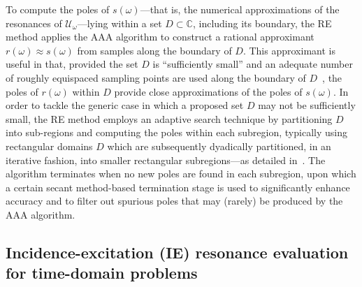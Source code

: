 \documentclass[11pt]{article}
\theoremstyle{plain}
\theoremstyle{remark}
\begin{document}
To compute the poles of $s(\omega)$---that is, the numerical
approximations of the resonances of $\mathcal{U}_\omega$---lying
within a set $D\subset \mathbb{C}$, including its boundary, the RE
method applies the AAA algorithm to construct a rational approximant
$r(\omega)\approx s(\omega)$ from samples along the boundary of
$D$. This approximant is useful in that, provided the set $D$ is
``sufficiently small'' and an adequate number of roughly equispaced
sampling points are used along the boundary of $D$~\cite[Rem. 4]{bst},
the poles of $r(\omega)$ within $D$ provide close approximations of
the poles of $s(\omega)$. In order to tackle the generic case in which
a proposed set $D$ may not be sufficiently small, the RE method
employs an adaptive search technique by partitioning $D$ into
sub-regions and computing the poles within each subregion, typically
using rectangular domains $D$ which are subsequently dyadically
partitioned, in an iterative fashion, into smaller rectangular
subregions---as detailed in~\cite{bst}. The algorithm terminates when
no new poles are found in each subregion, upon which a certain secant
method-based termination stage is used to significantly enhance
accuracy and to filter out spurious poles that may (rarely) be
produced by the AAA algorithm.

\subsection{Incidence-excitation  (IE) resonance evaluation for time-domain problems}\label{sec:realleftscal}
\end{document}
